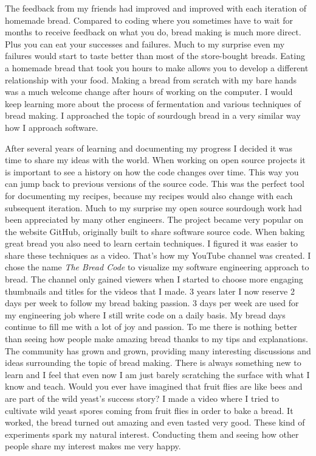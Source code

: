 The feedback from my friends had improved and improved with each
iteration of homemade bread. Compared to coding where
you sometimes have to wait for months to receive feedback on what you do,
bread making is much more direct. Plus you can eat your successes and failures.
Much to my surprise even my failures would start to taste
better than most of the store-bought breads. Eating a homemade bread that
took you hours to make allows you to develop a different relationship
with your food. Making a bread from scratch with my bare hands
was a much welcome change after hours of working on the computer.
I would keep learning more about the process of fermentation and
various techniques of bread making. I approached the topic of sourdough bread
in a very similar way how I approach software.

After several years of learning and documenting my progress I decided it was
time to share my ideas with the world. When working on open source projects
it is important to see a history on how the code changes over time. This
way you can jump back to previous versions of the source code. This was
the perfect tool for documenting my recipes, because my recipes would also change
with each subsequent iteration. Much to my surprise my open source sourdough
work had been appreciated by many other engineers. The project became
very popular on the website GitHub, originally built to share software
source code. When baking great bread you also need to learn certain techniques.
I figured it was easier to share these techniques as a video. That's how
my YouTube channel was created. I chose the name {\it The Bread Code} to
visualize my software engineering approach to bread. The channel only gained
viewers when I started to choose more engaging thumbnails and titles for
the videos that I made. 3 years later I now reserve 2 days per week
to follow my bread baking passion. 3 days per week are used for my engineering
job where I still write code on a daily basis. My bread days continue
to fill me with a lot of joy and passion. To me there is nothing better than
seeing how people make amazing bread thanks to my tips and explanations.
The community has grown and grown, providing many interesting discussions
and ideas surrounding the topic of bread making. There is always something
new to learn and I feel that even now I am just barely scratching the surface with
what I know and teach. Would you ever have imagined that fruit flies are like
bees and are part of the wild yeast's success story? I made a video where
I tried to cultivate wild yeast spores coming from fruit flies in order
to bake a bread. It worked, the bread turned out amazing and even tasted
very good. These kind of experiments spark my natural interest. Conducting them
and seeing how other people share my interest makes me very happy.

